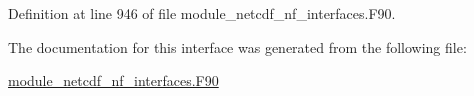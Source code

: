 Definition at line 946 of file module\+\_\+netcdf\+\_\+nf\+\_\+interfaces.\+F90.



The documentation for this interface was generated from the following file\+:\begin{DoxyCompactItemize}
\item 
\hyperlink{module__netcdf__nf__interfaces_8F90}{module\+\_\+netcdf\+\_\+nf\+\_\+interfaces.\+F90}\end{DoxyCompactItemize}
